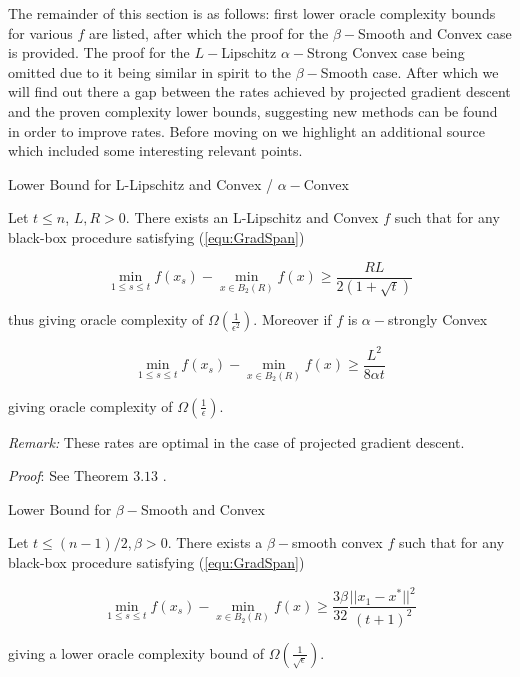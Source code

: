 The remainder of this section is as follows: first lower oracle complexity bounds for various $f$ are listed, after which the proof for the $\beta-$Smooth and Convex case is provided. The proof for the $L-$Lipschitz $\alpha-$Strong Convex case being omitted due to it being similar in spirit to the $\beta-$Smooth case. After which we will find out there a gap between the rates achieved by projected gradient descent and the proven complexity lower bounds, suggesting new methods can be found in order to improve rates. Before moving on we highlight an additional source \cite[75-76]{bach} which included some interesting relevant points.


\begin{theorem}{Lower Bound for L-Lipschitz and Convex / $\alpha-$Convex }

Let  $t \leq n$, $L,R > 0$. There exists an L-Lipschitz and Convex $f$ such that for any black-box procedure satisfying (\ref{equ:GradSpan})

\begin{equation}
\min_{1 \leq s \leq t} f(x_s) - \min_{x \in B_2(R)}f(x) \geq \frac{RL}{2(1+\sqrt{t})}
\end{equation} 

thus giving oracle complexity of $\Omega\left(\frac{1}{\epsilon^2}\right)$.  Moreover if $f$ is $\alpha-$strongly  Convex  

\begin{equation}
\min_{1 \leq s \leq t} f(x_s) - \min_{x \in B_2(R)}f(x) \geq \frac{L^2}{8 \alpha t}
\end{equation} 

giving oracle complexity of $\Omega\left(\frac{1}{\epsilon}\right)$.

\textit{Remark:} These rates are optimal in the case of projected gradient descent. 

\textit{Proof}: See Theorem $3.13$ \cite{bubeck}.
\end{theorem}





\begin{theorem}{Lower Bound for $\beta-$Smooth and Convex}

Let $t \leq (n-1)/2, \beta > 0$. There exists a $\beta-$smooth convex $f$ such that for any black-box procedure satisfying (\ref{equ:GradSpan})

\begin{equation}
\min_{1 \leq s \leq t} f(x_s) - \min_{x \in B_2(R)}f(x) \geq \frac{3\beta}{32} \frac{||x_1 - x^{*}||^2}{(t+1)^2}
\label{equ:LowerBoundBetaSmooth}
\end{equation} 


giving a lower oracle  complexity  bound of $\Omega\left(\frac{1}{\sqrt{\epsilon}}\right)$.
\label{Theorem:LowerBoundBeta}
\end{theorem}


